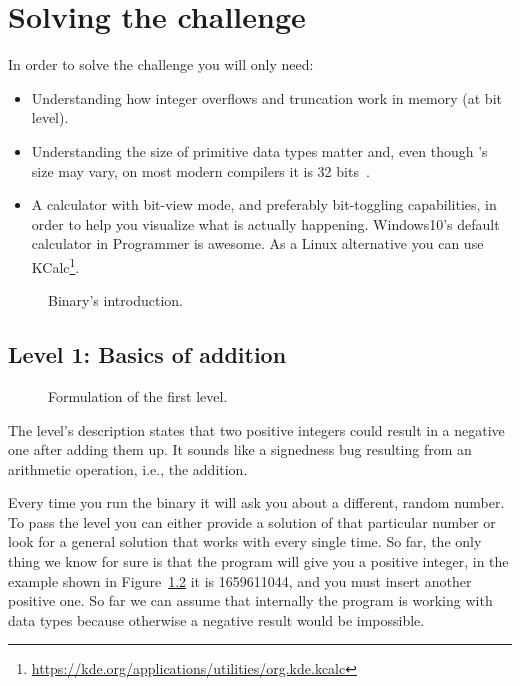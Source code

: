 \chapter{Solving the challenge}

In order to solve the challenge you will only need:
\begin{itemize}
	\item{Understanding how integer overflows and truncation work in memory (at bit level).}
	\item{Understanding the size of primitive data types matter and, even though 's size may vary, on most modern compilers it is 32 bits~\cite{QuoraDataTypesSizes, NewCIntegerC99}.}
	\item{A calculator with bit-view mode, and preferably bit-toggling capabilities, in order to help you visualize what is actually happening. Windows10's default calculator in Programmer is awesome. As a Linux alternative you can use KCalc\footnote{\url{https://kde.org/applications/utilities/org.kde.kcalc}}.}
\end{itemize}

\begin{figure}[h]
	\label{fig:binary_intro}
	\caption{Binary's introduction.}
\end{figure}

\section{Level 1: Basics of addition}

\begin{figure}[!htbp]
	\label{fig:intro_level1}
	\caption{Formulation of the first level.}
\end{figure}

The level's description states that two positive integers could result in a negative one after adding them up. It sounds like a signedness bug resulting from an arithmetic operation, i.e., the  addition.

Every time you run the binary it will ask you about a different, random number. To pass the level you can either provide a solution of that particular number or look for a general solution that works with every single time. So far, the only thing we know for sure is that the program will give you a positive integer, in the example shown in Figure~\ref{fig:intro_level1} it is 1659611044, and you must insert another positive one. So far we can assume that internally the program is working with  data types because otherwise a negative result would be impossible. 

